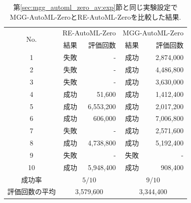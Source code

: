\documentclass[11pt,oneside,openany,report]{jsbook}
\begin{document}
\begin{table}[tbp]
  \caption{第\ref{sec:mgg_automl_zero_av:exp}節と同じ実験設定でMGG-AutoML-ZeroとRE-AutoML-Zeroを比較した結果. }
  \label{table:re_vs_mgg}
  \centering
  \begin{tabular}{|c|cr|cr|}
    \hline
    \multirow{2}{*}{No. }
            & \multicolumn{2}{c|}{RE-AutoML-Zero} & \multicolumn{2}{c|}{MGG-AutoML-Zero}                  \\
            & 結果                                  & 評価回数                                 & 結果 & 評価回数      \\
    \hline \hline
    1       & 失敗                                  & -                                    & 成功 & 2,874,000 \\
    2       & 失敗                                  & -                                    & 成功 & 4,486,800 \\
    3       & 失敗                                  & -                                    & 成功 & 3,630,000 \\
    4       & 成功                                  & 51,600                               & 成功 & 1,412,400 \\
    5       & 成功                                  & 6,553,200                            & 成功 & 2,017,200 \\
    6       & 成功                                  & 606,000                              & 成功 & 7,006,800 \\
    7       & 失敗                                  & -                                    & 成功 & 2,571,600 \\
    8       & 成功                                  & 4,738,800                            & 成功 & 5,192,400 \\
    9       & 失敗                                  & -                                    & 失敗 & -         \\
    10      & 成功                                  & 5,948,400                            & 成功 & 908,400   \\
    \hline
    成功率     & \multicolumn{2}{c|}{$5/10$}         & \multicolumn{2}{c|}{$9/10$}                           \\
    \hline
    評価回数の平均 & \multicolumn{2}{c|}{3,579,600}      & \multicolumn{2}{c|}{3,344,400}                        \\
    \hline
  \end{tabular}
\end{table}
\end{document}
